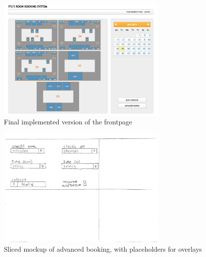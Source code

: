 \begin{figure}[htb]
\begin{center}
\leavevmode
\includegraphics[width=0.75\textwidth]{images/frontpage}
\end{center}
\caption{Final implemented version of the frontpage}
\label{fig:app1_mock3_1f}
\end{figure}

\begin{figure}[htb]
\begin{center}
\leavevmode
\includegraphics[width=0.75\textwidth]{images/adv1}
\end{center}
\caption{Sliced mockup of advanced booking, with placeholders for overlays}
\label{fig:app1_mock1_4}
\end{figure}

